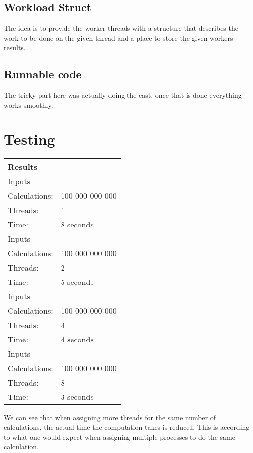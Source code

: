 \subsection{Workload Struct}
The idea is to provide the worker threads with a structure that describes the work to be done on the given thread and a place to store the given workers results.



\subsection{Runnable code}
The tricky part here was actually doing the cast, once that is done everything works smoothly.




\section{Testing}



\newcommand{\rowhead}[1] {
\multicolumn{2}{l}{#1}\\
\hline
}

\newcommand{\row}[3] {
\hline
\rowcolor{gr1}
Inputs&\\
\hline \hline
\rowcolor{gr2}
Calculations: & #1 \\
\hline
\rowcolor{gr2}
Threads: & #2 \\
\hline
\rowcolor{gr2}
Time: & #3 \\
\hline \hline
}

\newcommand{\botrow}[3] {
\hline
\rowcolor{gr1}
Inputs&\\
\hline \hline
\rowcolor{gr2}
N = & #1 \\
\hline
\rowcolor{gr2}
Threads: & #2 \\
\hline
\rowcolor{gr2}
Time: & #3 \\
\hline
}

\begin{table}[ht]
\begin{tabular}{| p{} | p{} |}
\rowhead{Results}
\row{100 000 000 000}{1}{8 seconds}
\row{100 000 000 000}{2}{5 seconds}
\row{100 000 000 000}{4}{4 seconds}
\row{100 000 000 000}{8}{3 seconds}
\end{tabular}
\end{table}

We can see that when assigning more threads for the same number of calculations, the actual time the computation takes is reduced.
This is according to what one would expect when assigning multiple processes to do the same calculation.